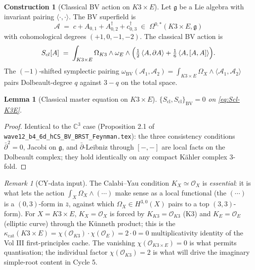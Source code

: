 \documentclass[11pt]{amsart}
\providecommand{\C}{\mathbb{C}}
\providecommand{\cO}{\mathcal{O}}
\providecommand{\cA}{\mathcal{A}}
\providecommand{\dbar}{\bar{\partial}}
\providecommand{\g}{\mathfrak{g}}
\providecommand{\BV}{\mathrm{BV}}
\providecommand{\kcat}{\kappa_{\mathrm{cat}}}
\theoremstyle{plain}
\newtheorem{lemma}[theorem]{Lemma}
\theoremstyle{definition}
\newtheorem{construction}[theorem]{Construction}
\theoremstyle{remark}
\newtheorem{remark}[theorem]{Remark}
\begin{document}
\begin{construction}[Classical BV action on $K3\times E$]\label{cons:BV-K3E}
Let $\g$ be a Lie algebra with invariant pairing $\langle\cdot,\cdot\rangle$.
The BV superfield is
\[
\cA \;=\; c + A_{0,1} + A_{0,2}^{\dagger} + c_{0,3}^{\dagger} \;\in\;
\Omega^{0,\ast}(K3\times E, \g)
\]
with cohomological degrees $(+1, 0, -1, -2)$. The classical BV action
is
\begin{equation}\label{eq:Scl-K3E}
S_{\mathrm{cl}}[\cA] \;=\; \int_{K3\times E} \Omega_{K3}\wedge \omega_{E}
\wedge \Bigl(\tfrac12\,\langle\cA, \dbar \cA\rangle +
\tfrac16\,\langle\cA, [\cA, \cA]\rangle\Bigr).
\end{equation}
The $(-1)$-shifted symplectic pairing $\omega_{\BV}(\cA_{1}, \cA_{2})
= \int_{K3\times E} \Omega_{X}\wedge \langle\cA_{1}, \cA_{2}\rangle$
pairs Dolbeault-degree $q$ against $3-q$ on the total space.
\end{construction}

\begin{lemma}[Classical master equation on $K3\times E$]
\label{lem:CME-K3E}
$\{S_{\mathrm{cl}}, S_{\mathrm{cl}}\}_{\BV} = 0$ on
\eqref{eq:Scl-K3E}.
\end{lemma}

\begin{proof}
Identical to the $\C^{3}$ case (Proposition 2.1 of
\texttt{wave12\_b4\_6d\_hCS\_BV\_BRST\_Feynman.tex}): the three
consistency conditions $\dbar^{2}=0$, Jacobi on $\g$, and $\dbar$-Leibniz
through $[-,-]$ are local facts on the Dolbeault complex; they hold
identically on any compact K\"ahler complex $3$-fold.
\end{proof}

\begin{remark}[CY-data input]\label{rem:CY-data}
The Calabi--Yau condition $K_{X} \simeq \cO_{X}$ is \emph{essential}:
it is what lets the action $\int_{X}\Omega_{X}\wedge(\cdots)$ make
sense as a local functional (the $(\cdots)$ is a $(0,3)$-form in
$\bar z$, against which $\Omega_{X}\in H^{3,0}(X)$ pairs to a top
$(3,3)$-form). For $X = K3\times E$, $K_{X}=\cO_{X}$ is forced by
$K_{K3} = \cO_{K3}$ (K3) and $K_{E}=\cO_{E}$ (elliptic curve) through
the K\"unneth product; this is the $\kcat(K3\times E) =
\chi(\cO_{K3})\cdot \chi(\cO_{E}) = 2\cdot 0 = 0$ multiplicativity
identity of the Vol III first-principles cache. The vanishing
$\chi(\cO_{K3\times E}) = 0$ is what permits quantisation; the
individual factor $\chi(\cO_{K3})=2$ is what will drive the imaginary
simple-root content in Cycle 5.
\end{remark}
\end{document}
